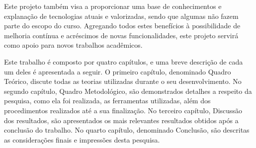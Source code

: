 \par Este projeto também visa a proporcionar uma base de conhecimentos e explanação de tecnologias atuais e valorizadas, sendo que algumas não fazem parte do escopo do curso. Agregando todos estes benefícios à possibilidade de melhoria contínua e acréscimos de novas funcionalidades, este projeto servirá como apoio para novos trabalhos acadêmicos.

\par Este trabalho é composto por quatro capítulos, e uma breve descrição de cada um deles é apresentada a seguir. O primeiro capítulo, denominado Quadro Teórico, discute todas as teorias utilizadas durante o seu desenvolvimento. No segundo capítulo, Quadro Metodológico, são demonstrados detalhes a respeito da pesquisa, como ela foi realizada, as ferramentas utilizadas, além dos procedimentos realizados até a sua finalização. No terceiro capítulo, Discussão dos resultados, são apresentados os mais relevantes resultados obtidos após a conclusão do trabalho. No quarto capítulo, denominado Conclusão, são descritas as considerações finais e impressões desta pesquisa.